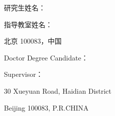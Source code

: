 \newpage
\pagestyle{empty}

\begin{titlepage}
\begin{center}
\qquad
\vspace{10mm}

\centerline{\ThesisTitleCN} \par    %
\vspace{10mm}

\centerline{\ThesisSubTitleCN} \par
\vspace{20mm}

\centerline{\ThesisTitleEN} \par    %
\vspace{10mm}

\centerline{\ThesisSubTitleEN} \par
\vspace{40mm}

研究生姓名：\AuthorCN \par
\vspace{3mm}
指导教室姓名：\TeacherCN \par
\vspace{3mm}
\UniversityCN \SchoolCN \par
\vspace{3mm}
北京 100083，中国 \par
\vspace{8mm}

Doctor Degree Candidate：\AuthorEN \par
\vspace{3mm}
Supervisor：\TeacherEN \par
\vspace{3mm}
\SchoolEN \par
\vspace{3mm}
\UniversityEN \par
\vspace{3mm}
30 Xueyuan Road, Haidian District \par
\vspace{3mm}
Beijing 100083, P.R.CHINA

\end{center}
\end{titlepage}

